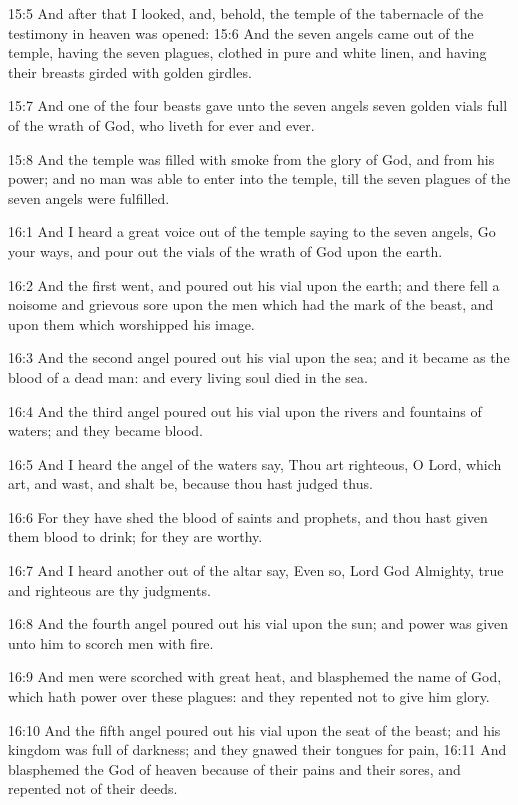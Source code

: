 15:5 And after that I looked, and, behold, the temple of the
tabernacle of the testimony in heaven was opened: 15:6 And the seven
angels came out of the temple, having the seven plagues, clothed in
pure and white linen, and having their breasts girded with golden
girdles.

15:7 And one of the four beasts gave unto the seven angels seven
golden vials full of the wrath of God, who liveth for ever and ever.

15:8 And the temple was filled with smoke from the glory of God, and
from his power; and no man was able to enter into the temple, till the
seven plagues of the seven angels were fulfilled.

16:1 And I heard a great voice out of the temple saying to the seven
angels, Go your ways, and pour out the vials of the wrath of God upon
the earth.

16:2 And the first went, and poured out his vial upon the earth; and
there fell a noisome and grievous sore upon the men which had the mark
of the beast, and upon them which worshipped his image.

16:3 And the second angel poured out his vial upon the sea; and it
became as the blood of a dead man: and every living soul died in the
sea.

16:4 And the third angel poured out his vial upon the rivers and
fountains of waters; and they became blood.

16:5 And I heard the angel of the waters say, Thou art righteous, O
Lord, which art, and wast, and shalt be, because thou hast judged
thus.

16:6 For they have shed the blood of saints and prophets, and thou
hast given them blood to drink; for they are worthy.

16:7 And I heard another out of the altar say, Even so, Lord God
Almighty, true and righteous are thy judgments.

16:8 And the fourth angel poured out his vial upon the sun; and power
was given unto him to scorch men with fire.

16:9 And men were scorched with great heat, and blasphemed the name of
God, which hath power over these plagues: and they repented not to
give him glory.

16:10 And the fifth angel poured out his vial upon the seat of the
beast; and his kingdom was full of darkness; and they gnawed their
tongues for pain, 16:11 And blasphemed the God of heaven because of
their pains and their sores, and repented not of their deeds.

